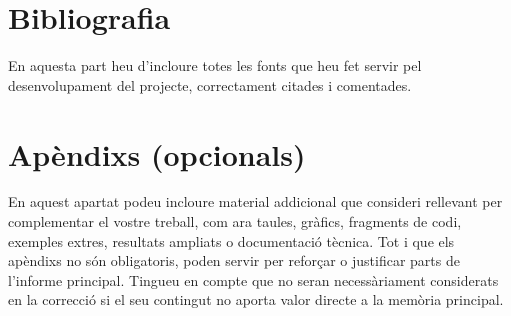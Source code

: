 \section*{Bibliografia}

En aquesta part heu d’incloure totes les fonts que heu fet servir pel desenvolupament del projecte, correctament citades i comentades.

\section*{Apèndixs (opcionals)}

En aquest apartat podeu incloure material addicional que consideri rellevant per complementar el vostre treball, com ara taules, gràfics, fragments de codi, exemples extres, resultats ampliats o documentació tècnica. Tot i que els apèndixs no són obligatoris, poden servir per reforçar o justificar parts de l’informe principal. Tingueu en compte que no seran necessàriament considerats en la correcció si el seu contingut no aporta valor directe a la memòria principal.
